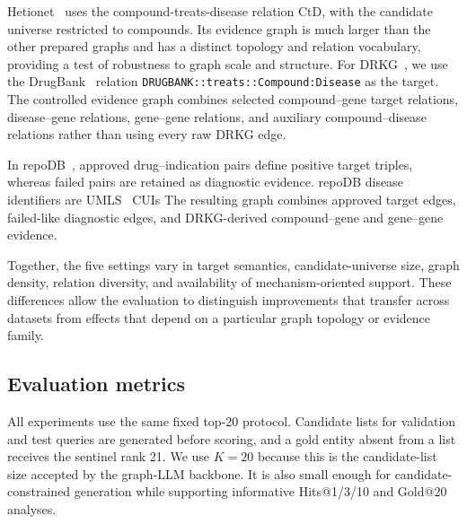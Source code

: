 \documentclass[pdflatex,sn-mathphys-num]{sn-jnl}
\begin{document}
Hetionet~\citep{himmelstein2017systematic} uses the compound-treats-disease relation CtD, with the candidate universe restricted to compounds. Its evidence graph is much larger than the other prepared graphs and has a distinct topology and relation vocabulary, providing a test of robustness to graph scale and structure. For DRKG~\citep{drkg2020}, we use the DrugBank~\citep{wishart2018drugbank} relation \texttt{DRUGBANK::treats::Compound:Disease} as the target. The controlled evidence graph combines selected compound--gene target relations, disease--gene relations, gene--gene relations, and auxiliary compound--disease relations rather than using every raw DRKG edge.

In repoDB~\citep{brown2017standard}, approved drug--indication pairs define positive target triples, whereas failed pairs are retained as diagnostic evidence. repoDB disease identifiers are UMLS~\citep{bodenreider2004unified} CUIs  The resulting graph combines approved target edges, failed-like diagnostic edges, and DRKG-derived compound--gene and gene--gene evidence. 

Together, the five settings vary in target semantics, candidate-universe size, graph density, relation diversity, and availability of mechanism-oriented support. These differences allow the evaluation to distinguish improvements that transfer across datasets from effects that depend on a particular graph topology or evidence family.

\subsection{Evaluation metrics}
\label{sec:evaluation_protocol}

All experiments use the same fixed top-20 protocol. Candidate lists for validation and test queries are generated before scoring, and a gold entity absent from a list receives the sentinel rank 21. We use $K=20$ because this is the candidate-list size accepted by the graph-LLM backbone. It is also small enough for candidate-constrained generation while supporting informative Hits@1/3/10 and Gold@20 analyses.
\end{document}
